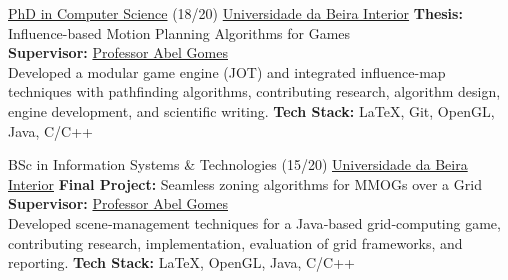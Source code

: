 \documentclass[
	a4paper,
]{fortysecondscv}
\begin{document}
\begin{cvtable}[3]

        {\href{https://www.di.ubi.pt/Cursos/dei/}{PhD in Computer Science} (18/20)}
        {\href{https://www.ubi.pt/}{Universidade da Beira Interior}}
        {
            \textbf{Thesis:} Influence-based Motion Planning Algorithms for Games\\
            \textbf{Supervisor:} \href{http://www.di.ubi.pt/~agomes/}{Professor Abel Gomes}\\
            Developed a modular game engine (JOT) and integrated influence-map techniques with pathfinding algorithms, contributing research, algorithm design, engine development, and scientific writing.
            \newline \textbf{Tech Stack:}
            {\color{sklimegreen}LaTeX},
            {\color{sklimegreen}Git},
            {\color{skyellow}OpenGL},
            {\color{skyellow}Java},
            {\color{skorange}C/C++}
        }

        {BSc in Information Systems \& Technologies (15/20)\vspace{0.3em}}
        {\href{https://www.ubi.pt/}{Universidade da Beira Interior}}
        {
            \textbf{Final Project:} Seamless zoning algorithms for MMOGs over a Grid\\
            \textbf{Supervisor:} \href{http://www.di.ubi.pt/~agomes/}{Professor Abel Gomes}\\
            Developed scene‑management techniques for a Java‑based grid‑computing game, contributing research, implementation, evaluation of grid frameworks, and reporting.
            \newline \textbf{Tech Stack:}
            {\color{sklimegreen}LaTeX},
            {\color{skyellow}OpenGL},
            {\color{skyellow}Java},
            {\color{skorange}C/C++}
        }


\end{cvtable}
\end{document}
